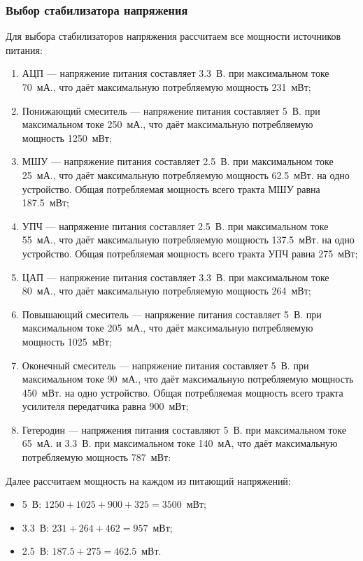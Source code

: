 \documentclass[utf8x, 14pt, oneside, a4paper]{article}
\begin{document}
			\subsubsection{Выбор стабилизатора напряжения}
			Для выбора стабилизаторов напряжения рассчитаем все мощности источников питания:
			\begin{enumerate}
				\item АЦП --- напряжение питания составляет 3.3~В. при максимальном токе 70~мА., что даёт максимальную потребляемую мощность 231~мВт;
				\item Понижающий смеситель --- напряжение питания составляет 5~В. при максимальном токе 250~мА., что даёт максимальную потребляемую мощность 1250~мВт;
				\item МШУ --- напряжение питания составляет 2.5~В. при максимальном токе 25~мА., что даёт максимальную потребляемую мощность 62.5~мВт. на одно устройство. Общая потребляемая мощность всего тракта МШУ равна 187.5~мВт;
				\item УПЧ --- напряжение питания составляет 2.5~В. при максимальном токе 55~мА., что даёт максимальную потребляемую мощность 137.5~мВт. на одно устройство. Общая потребляемая мощность всего тракта УПЧ равна 275~мВт;
				\item ЦАП --- напряжение питания составляет 3.3~В. при максимальном токе 80~мА., что даёт максимальную потребляемую мощность 264~мВт;
				\item Повышающий смеситель --- напряжение питания составляет 5~В. при максимальном токе 205~мА., что даёт максимальную потребляемую мощность 1025~мВт;
				\item Оконечный смеситель --- напряжение питания составляет 5~В. при максимальном токе 90~мА., что даёт максимальную потребляемую мощность 450~мВт. на одно устройство. Общая потребляемая мощность всего тракта усилителя передатчика равна 900~мВт;
				\item Гетеродин --- напряжения питания составляют 5~В. при максимальном токе 65~мА. и 3.3~В. при максимальном токе 140~мА, что даёт максимальную потребляемую мощность 787~мВт:
			\end{enumerate}
		
			Далее рассчитаем мощность на каждом из питающий напряжений:
			
			\begin{itemize}
				\item 5~В: $ 1250 + 1025 + 900 + 325 = 3500 $~мВт;
				\item 3.3~В: $231 + 264 + 462 = 957 $~мВт;
				\item 2.5~В: $ 187.5 + 275 =  462.5 $~мВт.
			\end{itemize}
			
\end{document}
